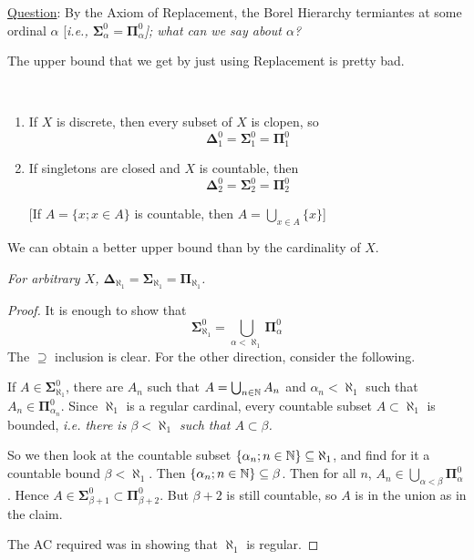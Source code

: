 \documentclass[]{article}
\newcommand{\bosig}{\bm{\Sigma}}
\newcommand{\bopi}{\bm{\Pi}}
\newcommand{\bodel}{\bm{\Delta}}
\begin{document}
\underline{Question}: By the Axiom of Replacement, the Borel Hierarchy termiantes at some ordinal $\alpha$ [\it{i.e.}, $\bosig_\alpha^0 = \bopi_\alpha^0$]; what can we say about $\alpha$?

The upper bound that we get by just using Replacement is pretty bad.

\begin{remark*}[Observations]\ 
    \begin{enumerate}
    \item If $X$ is discrete, then every subset of $X$ is clopen, so $$\bodel_1^0 = \bosig_1^0 = \bopi_1^0$$
    \item If singletons are closed and $X$ is countable, then $$\bodel_2^0 = \bosig_2^0 = \bopi_2^0$$
    
    [If $A = \{x; x \in A\}$ is countable, then $A = \bigcup_{x\in A}\{x\}$] 
    \end{enumerate}
\end{remark*}

We can obtain a better upper bound than by the cardinality of $X$.

\begin{remark*}
    \emph{
    For arbitrary $X$, $\bodel_{\aleph_1} = \bosig_{\aleph_1} = \bopi_{\aleph_1}$.
    }
\end{remark*}
\begin{proof}
    It is enough to show that $$ \bosig_{\aleph_1}^0 = \bigcup_{\alpha < \aleph_1} \bopi_{\alpha}^0$$
    The $\supseteq$ inclusion is clear. For the other direction, consider the following.

    If $A \in \bosig_{\aleph_1}^0$, there are $A_n$ such that $A = \bigcup_{n\in\mathbb{N}}A_n$ and $\alpha_n < \aleph_1$ such that $A_n \in \bopi_{\alpha_n}^0$. Since $\aleph_1$ is a regular cardinal, every countable subset $A \subset \aleph_1$ is bounded, \it{i.e.} there is $\beta < \aleph_1$ such that $A\subset \beta$.

    So we then look at the countable subset $\{\alpha_n ; n \in \mathbb{N}\}\subseteq \aleph_1$, and find for it a countable bound $\beta < \aleph_1$. Then $\{\alpha_n ; n\in\mathbb{N}\} \subseteq \beta$. Then for all $n$, $A_n \in \bigcup_{\alpha < \beta}\bopi_\alpha^0$. Hence $A \in \bosig_{\beta+1}^0\subset \bopi_{\beta+2}^0$. But $\beta+2$ is still countable, so $A$ is in the union as in the claim.

    The AC required was in showing that $\aleph_1$ is regular.
\end{proof}
\end{document}
